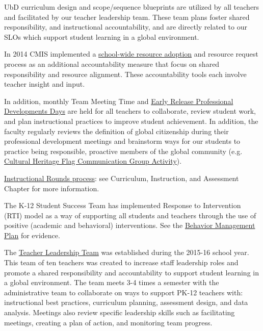 \begin{findings}
UbD curriculum design and scope/sequence blueprints are utilized by all teachers and facilitated by our teacher leadership team. These team plans foster shared responsibility, and instructional accountability, and are directly related to our SLOs which support student learning in a global environment. 

In 2014 CMIS implemented a \href{https://docs.google.com/a/cmis.ac.th/presentation/d/1wta0iJ57lCPiV0uJm9plaDBeCSll-VbBkMQUeGwpons/edit?usp=sharing}{school-wide resource adoption} and resource request process as an additional accountability measure that focus on shared responsibility and resource alignment. These accountability tools each involve teacher insight and input. 


In addition, monthly Team Meeting Time and \href{https://docs.google.com/document/d/1tSEBD59kwf83Z0-m1Q4hzNrVwaJMHdracrghwqoSdW0/edit?ts=589d238c}{Early Release Professional Developments Days} are held for all teachers to collaborate, review student work, and plan instructional practices to improve student achievement. In addition, the faculty regularly reviews the definition of global citizenship during their professional development meetings and brainstorm ways for our students to practice being responsible, proactive members of the global community (e.g. \href{https://docs.google.com/a/cmis.ac.th/document/d/1fJmuufIbXlGt7DGAuQ3OBW00VdOY_1QgqLzgEpmxdKQ/edit?usp=sharing}{Cultural Heritage Flag Communication Group Activity}).

\href{https://docs.google.com/document/d/1eDtOzhe_JnpVQmEIoF-IO0ejVrDalm8s0i6PaiDl9hs/edit}{Instructional Rounds process}: see Curriculum, Instruction, and Assessment Chapter for more information. 

The K-12 Student Success Team has implemented Response to Intervention (RTI) model as a way of supporting all students and teachers through the use of positive (academic and behavioral) interventions. See the \href{https://docs.google.com/document/d/16bGCvdQuhHquFdigvip3H5YgfubNVMStl7UpOfCRcFk/edit}{Behavior Management Plan} for evidence. 

The \href{https://docs.google.com/a/cmis.ac.th/document/d/1iW_tWIwRlWU2p0oIOvd3usDsxj9qYDt_2ROwNPBTHSc/edit?usp=sharing}{Teacher Leadership Team} was established during the 2015-16 school year. This team of ten teachers was created to increase staff leadership roles and promote a shared responsibility and accountability to support student learning in a global environment. The team meets 3-4 times a semester with the administrative team to collaborate on ways to support PK-12 teachers with: instructional best practices, curriculum planning, assessment design, and data analysis. Meetings also review specific leadership skills such as facilitating meetings, creating a plan of action, and monitoring team progress.


\end{findings}
